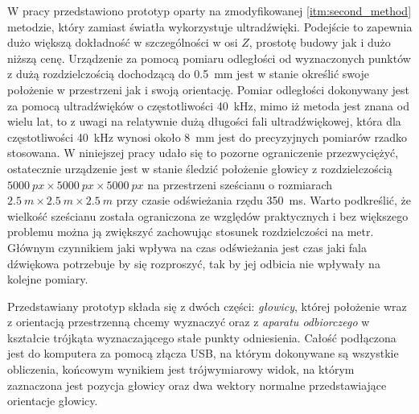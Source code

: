  W pracy przedstawiono prototyp oparty na zmodyfikowanej \ref{itm:second_method}
 metodzie, który zamiast światła wykorzystuje ultradźwięki. Podejście to zapewnia dużo większą
 dokładność w szczególności w osi $Z$, prostotę budowy jak i dużo niższą cenę.
 Urządzenie za pomocą pomiaru odległości od wyznaczonych punktów
z dużą rozdzielczością dochodzącą do \SI{0,5}{mm} jest w stanie określić swoje położenie
w przestrzeni jak i swoją orientację. 
Pomiar odległości dokonywany jest za pomocą ultradźwięków o częstotliwości \SI{40}{kHz},
mimo iż metoda jest znana od wielu lat, to z uwagi na relatywnie dużą długości fali ultradźwiękowej,
która dla częstotliwości \SI{40}{kHz} wynosi około \SI{8}{mm} jest do precyzyjnych pomiarów rzadko stosowana.
W niniejszej pracy udało się to pozorne ograniczenie przezwyciężyć,
ostatecznie urządzenie jest w stanie śledzić położenie głowicy z rozdzielczością 
$\SI{5000}{px} \times \SI{5000}{px} \times \SI{5000}{px}$ na przestrzeni sześcianu o rozmiarach 
$\SI{2,5}{m} \times \SI{2,5}{m}  \times \SI{2,5}{m} $ przy czasie odświeżania rzędu \SI{350}{ms}.
Warto podkreślić, że wielkość sześcianu została ograniczona ze względów praktycznych i bez 
większego problemu można ją zwiększyć zachowując stosunek rozdzielczości na metr.
Głównym czynnikiem jaki wpływa na czas odświeżania jest czas jaki fala dźwiękowa potrzebuje
by się rozproszyć, tak by jej odbicia nie wpływały na kolejne pomiary.

Przedstawiany prototyp składa się z dwóch części: \textit{głowicy}, której położenie wraz z orientacją przestrzenną chcemy wyznaczyć
oraz z \textit{aparatu odbiorczego} w kształcie trójkąta wyznaczającego stałe punkty odniesienia.
Całość  podłączona jest do komputera za pomocą złącza USB, na którym dokonywane są wszystkie obliczenia,
końcowym wynikiem jest trójwymiarowy widok, na którym zaznaczona jest pozycja głowicy oraz dwa wektory normalne
przedstawiające orientacje głowicy.




   